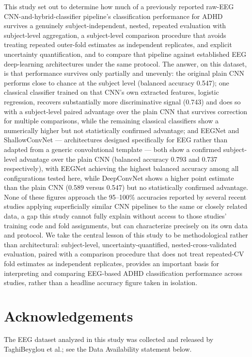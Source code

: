 \documentclass[a4paper,fleqn]{cas-sc}
\begin{document}
This study set out to determine how much of a previously reported raw-EEG CNN-and-hybrid-classifier pipeline's classification performance for ADHD survives a genuinely subject-independent, nested, repeated evaluation with subject-level aggregation, a subject-level comparison procedure that avoids treating repeated outer-fold estimates as independent replicates, and explicit uncertainty quantification, and to compare that pipeline against established EEG deep-learning architectures under the same protocol. The answer, on this dataset, is that performance survives only partially and unevenly: the original plain CNN performs close to chance at the subject level (balanced accuracy 0.547); one classical classifier trained on that CNN's own extracted features, logistic regression, recovers substantially more discriminative signal (0.743) and does so with a subject-level paired advantage over the plain CNN that survives correction for multiple comparisons, while the remaining classical classifiers show a numerically higher but not statistically confirmed advantage; and EEGNet and ShallowConvNet --- architectures designed specifically for EEG rather than adapted from a generic convolutional template --- both show a confirmed subject-level advantage over the plain CNN (balanced accuracy 0.793 and 0.737 respectively), with EEGNet achieving the highest balanced accuracy among all configurations tested here, while DeepConvNet shows a higher point estimate than the plain CNN (0.589 versus 0.547) but no statistically confirmed advantage. None of these figures approach the 95--100\% accuracies reported by several recent studies applying superficially similar CNN pipelines to the same or closely related data, a gap this study cannot fully explain without access to those studies' training code and fold assignments, but can characterize precisely on its own data and protocol. We take the central lesson of this study to be methodological rather than architectural: subject-level, uncertainty-quantified, nested-cross-validated evaluation, paired with a comparison procedure that does not treat repeated-CV fold estimates as independent replicates, provides an important basis for interpreting and comparing EEG-based ADHD classification performance across studies, rather than a headline accuracy figure taken in isolation.



\section*{Acknowledgements}
The EEG dataset analyzed in this study was collected and released by
TaghiBeyglou et al.; see the Data Availability statement below.
\end{document}
